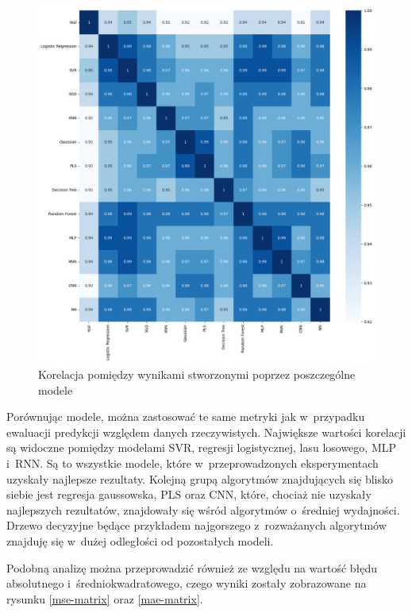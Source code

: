 \begin{figure}[H]
    \centering
    \includegraphics[width=\textwidth]{images/pred_corr.png}
    \caption{Korelacja pomiędzy wynikami stworzonymi poprzez poszczególne modele}
    \label{pred_corr}
\end{figure}

Porównując modele, można zastosować te same metryki jak w~przypadku ewaluacji predykcji względem 
danych rzeczywistych. Największe wartości korelacji są widoczne pomiędzy modelami SVR, regresji logistycznej,
lasu losowego, MLP i~RNN. Są to wszystkie modele, które w~przeprowadzonych eksperymentach uzyskały najlepsze
rezultaty. Kolejną grupą algorytmów znajdujących się blisko siebie jest regresja gaussowska, PLS oraz CNN,
które, chociaż nie uzyskały najlepszych rezultatów, znajdowały się wśród algorytmów o~średniej wydajności.
Drzewo decyzyjne będące przykładem najgorszego z~rozważanych algorytmów znajduję się w~dużej odległości
od pozostałych modeli.

Podobną analizę można przeprowadzić również ze względu na wartość błędu absolutnego i~średniokwadratowego,
czego wyniki zostały zobrazowane na rysunku \ref{mse-matrix} oraz \ref{mae-matrix}.

